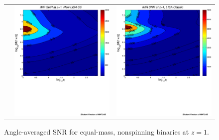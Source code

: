 \documentclass{iopart}
\begin{document}
\begin{figure}[htb]
\begin{center}
\begin{tabular}{ccc}
&\includegraphics[scale=0.33,clip=true]{FigEmanuele/C5IMRSNRContourz1.ps}
&\includegraphics[scale=0.33,clip=true]{FigEmanuele/IMRSNRContourz1.ps}\\
\end{tabular}
\caption{\label{fig:SNRz1} Angle-averaged SNR for equal-mass,
  nonspinning binaries at $z=1$.}
\end{center}
\end{figure}
%
\end{document}
